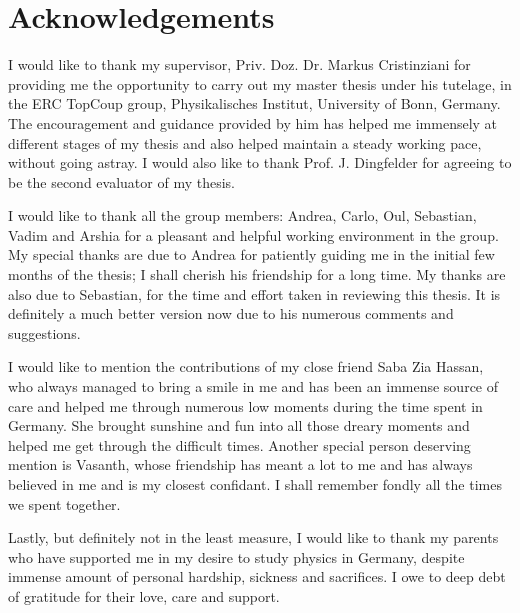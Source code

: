 \chapter*{Acknowledgements}

\label{sec:ack}

I would like to thank my supervisor, Priv. Doz. Dr. Markus Cristinziani for providing me the opportunity to carry out my master thesis under his tutelage, in the ERC TopCoup group, Physikalisches Institut, University of Bonn, Germany. The encouragement and guidance provided by him has helped me immensely at different stages of my thesis and also helped maintain a steady working pace, without going astray. I would also like to thank Prof. J. Dingfelder for agreeing to be the second evaluator of my thesis. 

I would like to thank all the group members: Andrea, Carlo, O{\g}ul, Sebastian, Vadim and Arshia for a pleasant and helpful working environment in the group. My special thanks are due to Andrea for patiently guiding me in the initial few months of the thesis; I shall cherish his friendship for a long time. My thanks are also due to Sebastian, for the time and effort taken in reviewing this thesis. It is definitely a much better version now due to his numerous comments and suggestions.

I would like to mention the contributions of my close friend Saba Zia Hassan, who always managed to bring a smile in me and has been an immense source of care and helped me through numerous low moments during the time spent in Germany. She brought sunshine and fun into all those dreary moments and helped me get through the difficult times. Another special person deserving mention is Vasanth, whose friendship has meant a lot to me and has always believed in me and is my closest confidant. I shall remember fondly all the times we spent together. 

Lastly, but definitely not in the least measure, I would like to thank my parents who have supported me in my desire to study physics in Germany, despite immense amount of personal hardship, sickness and sacrifices. I owe to deep debt of gratitude for their love, care and support. 
